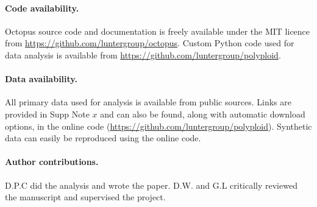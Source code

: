 \documentclass[notitlepage, twocolumn, 10pt]{article}
\begin{document}
\paragraph*{Code availability.} Octopus source code and documentation is freely available under the MIT licence from \url{https://github.com/luntergroup/octopus}. Custom Python code used for data analysis is available from \url{https://github.com/luntergroup/polyploid}.

\paragraph*{Data availability.} All primary data used for analysis is available from public sources. Links are provided in Supp Note $x$ and can also be found, along with automatic download options, in the online code (\url{https://github.com/luntergroup/polyploid}). Synthetic data can easily be reproduced using the online code.

\paragraph*{Author contributions.} D.P.C did the analysis and wrote the paper. D.W. and G.L critically reviewed the manuscript and supervised the project.
\end{document}
